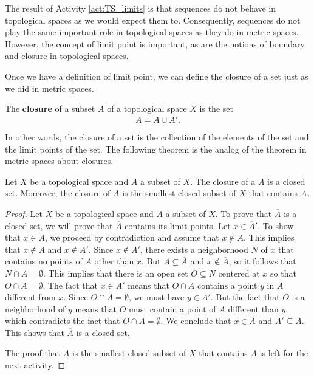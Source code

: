 The result of Activity \ref{act:TS_limits} is that sequences do not behave in topological spaces as we would expect them to. Consequently, sequences do not play the same important role in topological spaces as they do in metric spaces. However, the concept of limit point is important, as are the notions of boundary and closure in topological spaces. 


Once we have a definition of limit point, we can define the closure of a set just as we did in metric spaces. 

\begin{definition} The \textbf{closure} of a subset $A$ of a topological space $X$ is the set 
\[\overline{A} = A \cup A'.\]
\end{definition}

In other words, the closure of a set is the collection of the elements of the set and the limit points of the set. The following theorem is the analog of the theorem in metric spaces about closures. 

\begin{theorem} \label{thm:TS_closure_closed} Let $X$ be a topological space and $A$ a subset of $X$. The closure of a $A$ is a closed set. Moreover, the closure of $A$ is the smallest closed subset of $X$ that contains $A$. 
\end{theorem}

\begin{proof} Let $X$ be a topological space and $A$ a subset of $X$. To prove that $\overline{A}$ is a closed set, we will prove that $\overline{A}$ contains its limit points. Let $x \in \overline{A}'$. To show that $x \in \overline{A}$, we proceed by contradiction and assume that $x \notin \overline{A}$. This implies that $x \notin A$ and $x \notin A'$. Since $x \notin A'$, there exists a neighborhood $N$ of $x$ that contains no points of $A$ other than $x$. But $A \subseteq \overline{A}$ and $x \notin \overline{A}$, so it follows that $N \cap A = \emptyset$. This implies that there is an open set $O \subseteq N$ centered at $x$ so that $O \cap A = \emptyset$. The fact that $x \in \overline{A}'$ means that $O \cap \overline{A}$ contains a point $y$ in $\overline{A}$ different from $x$. Since $O \cap A = \emptyset$, we must have $y \in A'$. But the fact that $O$ is a neighborhood of $y$ means that $O$ must contain a point of $A$ different than $y$, which contradicts the fact that $O \cap A = \emptyset$. We conclude that $x \in \overline{A}$ and $\overline{A}' \subseteq \overline{A}$. This shows that $\overline{A}$ is a closed set. 

The proof that $\overline{A}$ is the smallest closed subset of $X$ that contains $A$ is left for the next activity.
\end{proof}

